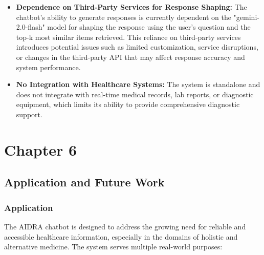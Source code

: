 \documentclass[12pt,a4paper]{report}
\newcommand{\titleKey}{AIDRA}
\begin{document}
\begin{itemize}
    \item \textbf{Dependence on Third-Party Services for Response Shaping:} The chatbot's ability to generate responses is currently dependent on the "gemini-2.0-flash" model for shaping the response using the user's question and the top-k most similar items retrieved. This reliance on third-party services introduces potential issues such as limited customization, service disruptions, or changes in the third-party API that may affect response accuracy and system performance.
    \item \textbf{No Integration with Healthcare Systems:} The system is standalone and does not integrate with real-time medical records, lab reports, or diagnostic equipment, which limits its ability to provide comprehensive diagnostic support.
\end{itemize}


%





	{\vfill \chapter*{\centering \vfill Chapter 6 \vfill}\vfill}
	\thispagestyle{empty}
	\newpage
	\label{Application and Future Work}
	\section{Application and Future Work}

\subsection{Application}
\label{Application}

The \titleKey{} chatbot is designed to address the growing need for reliable and accessible healthcare information, especially in the domains of holistic and alternative medicine. The system serves multiple real-world purposes:
\end{document}
